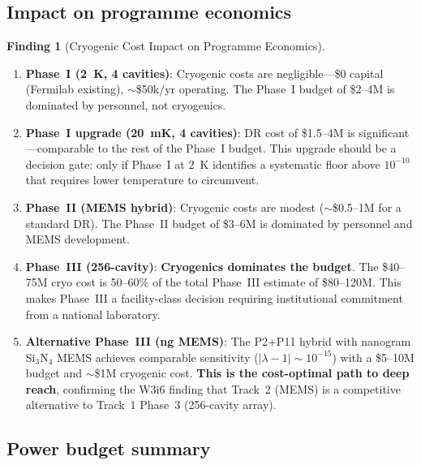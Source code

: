 \documentclass[11pt]{article}
\theoremstyle{definition}
\newtheorem{finding}[theorem]{Finding}
\theoremstyle{remark}
\newcommand{\lam}{|\lambda-1|}
\begin{document}
\subsection{Impact on programme economics}
\label{sec:economics}

\begin{finding}[Cryogenic Cost Impact on Programme Economics]
\label{find:cryo_economics}
\begin{enumerate}
  \item \textbf{Phase~I (2~K, 4 cavities)}: Cryogenic costs are
    negligible---\$0 capital (Fermilab existing), $\sim$\$50k/yr
    operating. The Phase~I budget of \$2--4M is dominated by personnel,
    not cryogenics.

  \item \textbf{Phase~I upgrade (20~mK, 4 cavities)}: DR cost of
    \$1.5--4M is significant---comparable to the rest of the Phase~I
    budget. This upgrade should be a decision gate: only if Phase~I at
    2~K identifies a systematic floor above $10^{-10}$ that requires
    lower temperature to circumvent.

  \item \textbf{Phase~II (MEMS hybrid)}: Cryogenic costs are modest
    ($\sim$\$0.5--1M for a standard DR). The Phase~II budget of
    \$3--6M is dominated by personnel and MEMS development.

  \item \textbf{Phase~III (256-cavity)}: \textbf{Cryogenics dominates
    the budget}. The \$40--75M cryo cost is 50--60\% of the total
    Phase~III estimate of \$80--120M. This makes Phase~III a
    facility-class decision requiring institutional commitment from a
    national laboratory.

  \item \textbf{Alternative Phase~III (ng MEMS)}: The P2+P11 hybrid
    with nanogram Si$_3$N$_4$ MEMS achieves comparable sensitivity
    ($\lam \sim 10^{-15}$) with a \$5--10M budget and $\sim$\$1M
    cryogenic cost. \textbf{This is the cost-optimal path to deep
    reach}, confirming the W3i6 finding that Track~2 (MEMS) is a
    competitive alternative to Track~1 Phase~3 (256-cavity array).
\end{enumerate}
\end{finding}

\subsection{Power budget summary}
\end{document}
